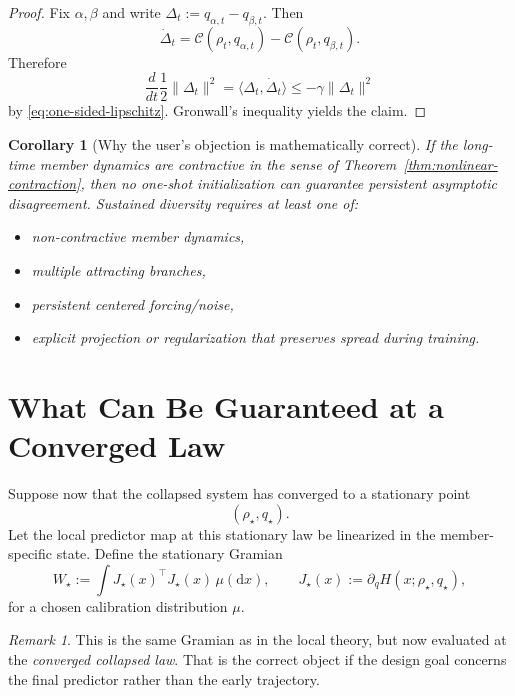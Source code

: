 \documentclass[11pt]{article}
\newtheorem{corollary}[theorem]{Corollary}
\theoremstyle{remark}
\newtheorem{remark}[theorem]{Remark}
\begin{document}
\begin{proof}
Fix $\alpha,\beta$ and write $\Delta_t:=q_{\alpha,t}-q_{\beta,t}$. Then
\[
\dot\Delta_t
=
\mathcal C(\rho_t,q_{\alpha,t})-\mathcal C(\rho_t,q_{\beta,t}).
\]
Therefore
\[
\frac{d}{dt}\frac12\|\Delta_t\|^2
=
\langle \Delta_t,\dot\Delta_t\rangle
\le
-\gamma \|\Delta_t\|^2
\]
by \eqref{eq:one-sided-lipschitz}. Gronwall's inequality yields the claim.
\end{proof}

\begin{corollary}[Why the user's objection is mathematically correct]
\label{cor:user-correct}
If the long-time member dynamics are contractive in the sense of Theorem~\ref{thm:nonlinear-contraction}, then no one-shot initialization can guarantee persistent asymptotic disagreement. Sustained diversity requires at least one of:
\begin{itemize}
\item non-contractive member dynamics,
\item multiple attracting branches,
\item persistent centered forcing/noise,
\item explicit projection or regularization that preserves spread during training.
\end{itemize}
\end{corollary}

\section{What Can Be Guaranteed at a Converged Law}

Suppose now that the collapsed system has converged to a stationary point
\[
(\rho_\star,q_\star).
\]
Let the local predictor map at this stationary law be linearized in the member-specific state. Define the stationary Gramian
\begin{equation}
W_\star
:=
\int J_\star(x)^\top J_\star(x)\,\mu(\mathrm dx),
\qquad
J_\star(x):=\partial_q H(x;\rho_\star,q_\star),
\label{eq:stationary-gramian}
\end{equation}
for a chosen calibration distribution $\mu$.

\begin{remark}
This is the same Gramian as in the local theory, but now evaluated at the \emph{converged collapsed law}. That is the correct object if the design goal concerns the final predictor rather than the early trajectory.
\end{remark}
\end{document}
